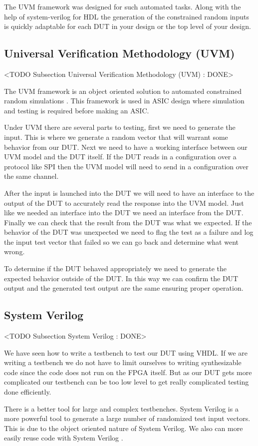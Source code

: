 The \ac{UVM} framework was designed for such automated tasks. Along with the help of system-verilog for \ac{HDL} the generation of the constrained random inputs is quickly adaptable for each \ac{DUT} in your design or the top level of your design.

\subsection{Universal Verification Methodology (UVM)}
	<TODO Subsection Universal Verification Methodology (UVM) : DONE>

The \ac{UVM} framework is an object oriented solution to automated constrained random simulations \cite{uvmref}. This framework is used in \ac{ASIC} design where simulation and testing is required before making an \ac{ASIC}.

Under \ac{UVM} there are several parts to testing, first we need to generate the input. This is where we generate a random vector that will warrant some behavior from our \ac{DUT}. Next we need to have a working interface between our \ac{UVM} model and the \ac{DUT} itself. If the \ac{DUT} reads in a configuration over a protocol like \ac{SPI} then the \ac{UVM} model will need to send in a configuration over the same channel. 

After the input is launched into the \ac{DUT} we will need to have an interface to the output of the \ac{DUT} to accurately read the response into the \ac{UVM} model. Just like we needed an interface into the \ac{DUT} we need an interface from the \ac{DUT}. Finally we can check that the result from the \ac{DUT} was what we expected. If the behavior of the \ac{DUT} was unexpected we need to flag the test as a failure and log the input test vector that failed so we can go back and determine what went wrong. 

To determine if the \ac{DUT} behaved appropriately we need to generate the expected behavior outside of the \ac{DUT}. In this way we can confirm the \ac{DUT} output and the generated test output are the same ensuring proper operation.  
	
\subsection{System Verilog}
	<TODO Subsection System Verilog : DONE>

We have seen how to write a testbench to test our \ac{DUT} using \ac{VHDL}. If we are writing a testbench we do not have to limit ourselves to writing synthesizable code since the code does not run on the \ac{FPGA} itself. But as our \ac{DUT} gets more complicated our testbench can be too low level to get really complicated testing done efficiently. 

There is a better tool for large and complex testbenches. System Verilog is a more powerful tool to generate a large number of randomized test input vectors. This is due to the object oriented nature of System Verilog. We also can more easily reuse code with System Verilog \cite{sysvref}. 
